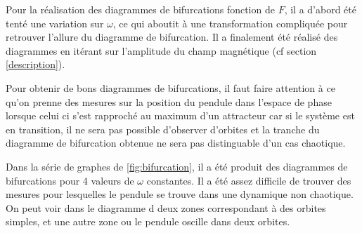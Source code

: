 \documentclass[a4paper,12pt,oneside]{article}
\begin{document}
Pour la réalisation des diagrammes de bifurcations fonction de $F$, il a d'abord été tenté une variation sur $\omega$, ce qui aboutit à une transformation compliquée pour retrouver l'allure du diagramme de bifurcation. Il a finalement été réalisé des diagrammes en itérant sur l'amplitude du champ magnétique (cf section \ref{description}).

Pour obtenir de bons diagrammes de bifurcations, il faut faire attention à ce qu'on prenne des mesures sur la position du pendule dans l'espace de phase lorsque celui ci s'est rapproché au maximum d'un attracteur car si le système est en transition, il ne sera pas possible d'observer d'orbites et la tranche du diagramme de bifurcation obtenue ne sera pas distinguable d'un cas chaotique.

Dans la série de graphes de \ref{fig:bifurcation}, il a été produit des diagrammes de bifurcations pour 4 valeurs de $\omega$ constantes. Il a été assez difficile de trouver des mesures pour lesquelles le pendule se trouve dans une dynamique non chaotique. On peut voir dans le diagramme d deux zones correspondant à des orbites simples, et une autre zone ou le pendule oscille dans deux orbites. 
\end{document}

